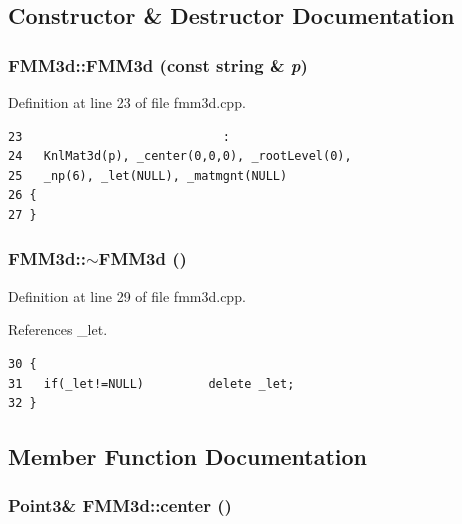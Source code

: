\subsection{Constructor \& Destructor Documentation}
\subsubsection{\setlength{\rightskip}{0pt plus 5cm}FMM3d::FMM3d (const string \& {\em p})}\label{classFMM3d_c6779767af55d215c788dcaf4dfbaf6e_c6779767af55d215c788dcaf4dfbaf6e}




Definition at line 23 of file fmm3d.cpp.

\footnotesize\begin{verbatim}23                            :
24   KnlMat3d(p), _center(0,0,0), _rootLevel(0),
25   _np(6), _let(NULL), _matmgnt(NULL)
26 {
27 }

\end{verbatim}\normalsize 


\subsubsection{\setlength{\rightskip}{0pt plus 5cm}FMM3d::$\sim$FMM3d ()}\label{classFMM3d_95ad154aae7c25cde0cc2a7108470c36_95ad154aae7c25cde0cc2a7108470c36}




Definition at line 29 of file fmm3d.cpp.

References \_\-let.

\footnotesize\begin{verbatim}30 {
31   if(_let!=NULL)         delete _let;
32 }
\end{verbatim}\normalsize 




\subsection{Member Function Documentation}
\subsubsection{\setlength{\rightskip}{0pt plus 5cm}Point3\& FMM3d::center ()\hspace{0.3cm}{\tt  [inline]}}\label{classFMM3d_5c0517b22b09f08712cbfd01aa1f29d7_5c0517b22b09f08712cbfd01aa1f29d7}


